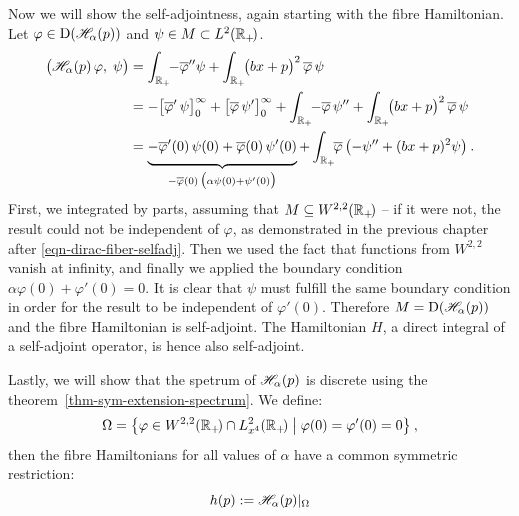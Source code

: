 Now we will show the self-adjointness, again starting with the fibre Hamiltonian. Let $\varphi \in \mathrm{D}(\mathscr{H}_\alpha(p))$ and $\psi \in M \subset L^2(\mathbb{R}_+\!)$.
\begin{align*}
    \big(\Hf_\alpha(p) \, \varphi, \; \psi \big)
    &= \int_{\R_+}\!\! -\overline\varphi'' \psi + \int_{\R_+}\!\! \big(bx + p\big)^2 \, \overline\varphi \, \psi \\
    &= - \big[ \overline\varphi' \, \psi \big]_0^\infty
    + \big[ \overline\varphi \, \psi' \big]_0^\infty
    + \int_{\R_+}\!\! -\overline\varphi \, \psi'' + \int_{\R_+}\!\! \big(bx + p\big)^2 \, \overline\varphi \, \psi \\
    &= \underbrace{
        - \overline\varphi'(0) \, \psi(0)
        + \overline\varphi(0) \, \psi'(0)
        \vphantom{\Big|}
    }_{
        -\overline\varphi(0) \,
        \big( \alpha \psi(0) + \psi'(0) \big)
    }
    + \int_{\R_+}\!\! \overline\varphi \, \big( {-\psi''} + (bx+p)^2 \psi \big) \: .
\end{align*}
First, we integrated by parts, assuming that $M\subseteq W^{2,2}(\mathbb{R}_+\!)$ ­– if it were not, the result could not be independent of $\varphi$, as demonstrated in the previous chapter after \eqref{eqn-dirac-fiber-selfadj}. Then we used the fact that functions from $W^{2,2}$ vanish at infinity, and finally we applied the boundary condition $\alpha \varphi(0) + \varphi'(0) = 0$. It is clear that $\psi$ must fulfill the same boundary condition in order for the result to be independent of $\varphi'(0)$. Therefore $M=\mathrm{D}(\mathscr{H}_\alpha(p))$ and the fibre Hamiltonian is self-adjoint. The Hamiltonian $H$, a direct integral of a self-adjoint operator, is hence also self-adjoint.

Lastly, we will show that the spetrum of $\mathscr{H}_\alpha(p)$ is discrete using the theorem~\ref{thm-sym-extension-spectrum}. We define:
\begin{equation*}
    \Omega = \big\{ \varphi \in W^{2,2}(\mathbb{R}_+\!) \cap L^2_{x^4}(\mathbb{R}_+\!) \;\big|\; \varphi(0) = \varphi'(0) = 0 \big\}
    \: ,
\end{equation*}
then the fibre Hamiltonians for all values of $\alpha$ have a common symmetric restriction:
\begin{equation*}
    h(p) := \mathscr{H}_\alpha(p) |_\Omega
\end{equation*}

